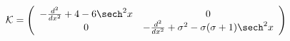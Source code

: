 \begin{equation} {\cal K}=\left( \begin{array}{cc}
-\frac{d^2}{dx^2}+4 -6 \sech^2 x & 0 \\ 0 &
-\frac{d^2}{dx^2}+\sigma^2 -\sigma (\sigma+1)\sech^2 x
\end{array} \right)  \label{eq:hesstk1}
\end{equation}

